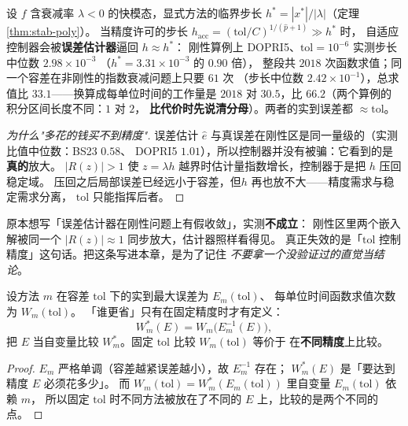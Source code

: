 \begin{theorem}
\label{thm:stiff-tol}
设 $f$ 含衰减率 $\lambda<0$ 的快模态，显式方法的临界步长
$h^\ast=|x^\ast|/|\lambda|$（定理 \ref{thm:stab-poly}）。
当精度许可的步长 $h_{\text{acc}}=(\mathrm{tol}/C)^{1/(\hat p+1)}\gg h^\ast$ 时，
自适应控制器会被\textbf{误差估计器}逼回 $h\approx h^\ast$：
刚性算例上 DOPRI5、$\mathrm{tol}=10^{-6}$ 实测步长中位数 $2.98\times10^{-3}$
（$h^\ast=3.31\times10^{-3}$ 的 $0.90$ 倍），
整段共 $2018$ 次函数求值；同一个容差在非刚性的指数衰减问题上只要 $61$ 次
（步长中位数 $2.42\times10^{-1}$），总求值比 $33.1$——换算成每单位时间的工作量是
$2018$ 对 $30.5$，比 $66.2$（两个算例的积分区间长度不同：$1$ 对 $2$，
\textbf{比代价时先说清分母}）。两者的实到误差都 $\approx\mathrm{tol}$。
\end{theorem}

\begin{proof}[为什么"多花的钱买不到精度"]
误差估计 $\hat e$ 与真误差在刚性区是同一量级的（实测比值中位数：BS23 $0.58$、
DOPRI5 $1.01$），所以控制器并没有被骗：它看到的是\textbf{真的}放大。
$|R(z)|>1$ 使 $z=\lambda h$ 越界时估计量指数增长，控制器于是把 $h$ 压回稳定域。
压回之后局部误差已经远小于容差，但$h$ 再也放不大——精度需求与稳定需求分离，
$\mathrm{tol}$ 只能指挥后者。\end{proof}

\begin{remark}[否定证据]
原本想写「误差估计器在刚性问题上有假收敛」，实测\textbf{不成立}：
刚性区里两个嵌入解被同一个 $|R(z)|\approx1$ 同步放大，估计器照样看得见。
真正失效的是「$\mathrm{tol}$ 控制精度」这句话。把这条写进本章，是为了记住
\emph{不要拿一个没验证过的直觉当结论}。
\end{remark}

\begin{theorem}
\label{thm:work-precision}
设方法 $m$ 在容差 $\mathrm{tol}$ 下的实到最大误差为 $E_m(\mathrm{tol})$、
每单位时间函数求值次数为 $W_m(\mathrm{tol})$。
「谁更省」只有在固定精度时才有定义：
\begin{equation}
  W_m^\ast(E)=W_m\bigl(E_m^{-1}(E)\bigr),
\end{equation}
把 $E$ 当自变量比较 $W_m^\ast$。固定 $\mathrm{tol}$ 比较 $W_m(\mathrm{tol})$ 等价于
在\textbf{不同精度}上比较。
\end{theorem}

\begin{proof}
$E_m$ 严格单调（容差越紧误差越小），故 $E_m^{-1}$ 存在；
$W_m^\ast(E)$ 是「要达到精度 $E$ 必须花多少」。
而 $W_m(\mathrm{tol})=W_m^\ast(E_m(\mathrm{tol}))$ 里自变量 $E_m(\mathrm{tol})$ 依赖 $m$，
所以固定 $\mathrm{tol}$ 时不同方法被放在了不同的 $E$ 上，比较的是两个不同的点。
\end{proof}

